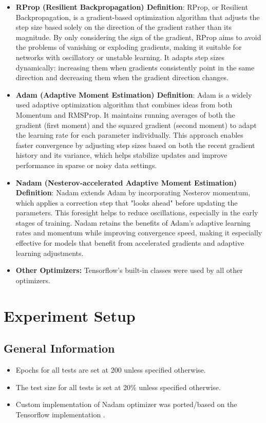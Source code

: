 \documentclass[conference]{IEEEtran}
\begin{document}
\begin{itemize}
    \item \textbf{RProp (Resilient Backpropagation) Definition}: RProp, or Resilient Backpropagation, is a gradient-based optimization algorithm that adjusts the step size based solely on the direction of the gradient rather than its magnitude. By only considering the sign of the gradient, RProp aims to avoid the problems of vanishing or exploding gradients, making it suitable for networks with oscillatory or unstable learning. It adapts step sizes dynamically: increasing them when gradients consistently point in the same direction and decreasing them when the gradient direction changes.
    \item \textbf{Adam (Adaptive Moment Estimation) Definition}: Adam is a widely used adaptive optimization algorithm that combines ideas from both Momentum and RMSProp. It maintains running averages of both the gradient (first moment) and the squared gradient (second moment) to adapt the learning rate for each parameter individually. This approach enables faster convergence by adjusting step sizes based on both the recent gradient history and its variance, which helps stabilize updates and improve performance in sparse or noisy data settings.
    \item \textbf{Nadam (Nesterov-accelerated Adaptive Moment Estimation) Definition}: Nadam extends Adam by incorporating Nesterov momentum, which applies a correction step that "looks ahead" before updating the parameters. This foresight helps to reduce oscillations, especially in the early stages of training. Nadam retains the benefits of Adam's adaptive learning rates and momentum while improving convergence speed, making it especially effective for models that benefit from accelerated gradients and adaptive learning adjustments.
    \item \textbf{Other Optimizers:} Tensorflow's built-in classes were used by all other optimizers.
\end{itemize}

\section{Experiment Setup}

\subsection{General Information}

\begin{itemize}
    \item Epochs for all tests are set at 200 unless specified otherwise. 
    \item The test size for all tests is set at 20\% unless specified otherwise.
    \item Custom implementation of Nadam optimizer was ported/based on the Tensorflow implementation \cite{b3}.
\end{itemize}
\end{document}
